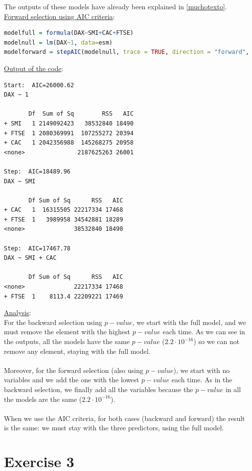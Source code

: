 \documentclass[a4paper, 11pt]{article}
\begin{document}
The outputs of these models have already been explained in \textcolor{blue}{\ref{muchotexto}}.
\vspace{2em}
\\\underline{Forward selection using AIC criteria}:
\begin{lstlisting}[language=R]
modelfull = formula(DAX~SMI+CAC+FTSE)
modelnull = lm(DAX~1, data=esm)
modelforward = stepAIC(modelnull, trace = TRUE, direction = "forward",                         scope = modelfull)
\end{lstlisting}
\vspace{1em}
\underline{Output of the code}:
\small\begin{verbatim}
Start:  AIC=26000.62
DAX ~ 1

       Df  Sum of Sq        RSS   AIC
+ SMI   1 2149092423   38532840 18490
+ FTSE  1 2080369991  107255272 20394
+ CAC   1 2042356988  145268275 20958
<none>               2187625263 26001

Step:  AIC=18489.96
DAX ~ SMI

       Df Sum of Sq      RSS   AIC
+ CAC   1  16315505 22217334 17468
+ FTSE  1   3989958 34542881 18289
<none>              38532840 18490

Step:  AIC=17467.78
DAX ~ SMI + CAC

       Df Sum of Sq      RSS   AIC
<none>              22217334 17468
+ FTSE  1    8113.4 22209221 17469
\end{verbatim}
\newpage
\hspace{-1.5em}\underline{Analysis}:\\
For the backward selection using $p-value$, we start with the full model, and we must remove the element with the highest $p-value$ each time. As we can see in the outputs, all the models have the same $p-value$ ($2.2\cdot 10^{-16}$) so we can not remove any element, staying with the full model.\\\\
Moreover, for the forward selection (also using $p-value$), we start with no variables and we add the one with the lowest $p-value$ each time. As in the backward selection, we finally add all the variables because the $p-value$ in all the models are the same ($2.2\cdot 10^{-16}$).\\\\
When we use the AIC criteria, for both cases (backward and forward) the result is the same: we must stay with the three predictors, using the full model.


\newpage
\section{Exercise 3}
\end{document}
